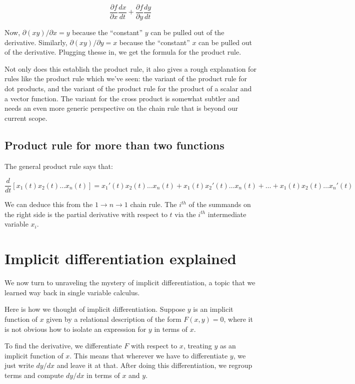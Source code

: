 \documentclass[10pt]{amsart}
\begin{document}
$$\frac{\partial f}{\partial x}\frac{dx}{dt} + \frac{\partial f}{\partial y}\frac{dy}{dt}$$

Now, $\partial(xy)/\partial x = y$ because the ``constant'' $y$ can be
pulled out of the derivative. Similarly, $\partial(xy)/\partial y = x$
because the ``constant'' $x$ can be pulled out of the
derivative. Plugging thesse in, we get the formula for the product
rule.

Not only does this establish the product rule, it also gives a rough
explanation for rules like the product rule which we've seen: the
variant of the product rule for dot products, and the variant of the
product rule for the product of a scalar and a vector function. The
variant for the cross product is somewhat subtler and needs an even
more generic perspective on the chain rule that is beyond our current
scope.

\subsection{Product rule for more than two functions}

The general product rule says that:

$$\frac{d}{dt}[x_1(t)x_2(t)\dots x_n(t)] = x_1'(t)x_2(t) \dots x_n(t) + x_1(t)x_2'(t) \dots x_n(t) + \dots + x_1(t)x_2(t) \dots x_n'(t)$$

We can deduce this from the $1 \to n \to 1$ chain rule. The $i^{th}$
of the summands on the right side is the partial derivative with
respect to $t$ via the $i^{th}$ intermediate variable $x_i$.

\section{Implicit differentiation explained}

We now turn to unraveling the mystery of implicit differentiation, a
topic that we learned way back in single variable calculus.

Here is how we thought of implicit differentiation. Suppose $y$ is an
implicit function of $x$ given by a relational description of the form
$F(x,y) = 0$, where it is not obvious how to isolate an expression for
$y$ in terms of $x$.

To find the derivative, we differentiate $F$ with respect to $x$,
treating $y$ as an implicit function of $x$. This means that wherever
we have to differentiate $y$, we just write $dy/dx$ and leave it at
that. After doing this differentiation, we regroup terms and compute
$dy/dx$ in terms of $x$ and $y$.
\end{document}
